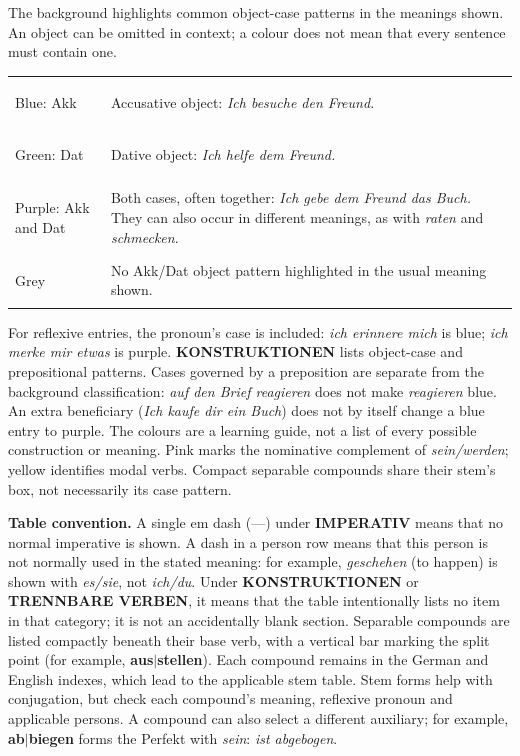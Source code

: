 \begin{tcolorbox}[colback=white,colframe=genderMasculine,title={Table colours},fonttitle=\bfseries]
The background highlights common object-case patterns in the meanings shown.
An object can be omitted in context; a colour does not mean that every sentence
must contain one.

\smallskip
\begin{tabularx}{\linewidth}{@{}lX@{}}
\colorbox{caseAccusativeBg}{\strut Blue: Akk} &
Accusative object: \textit{Ich besuche den Freund.}\\
\colorbox{caseDativeBg}{\strut Green: Dat} &
Dative object: \textit{Ich helfe dem Freund.}\\
\colorbox{caseAccusativeDativeBg}{\strut Purple: Akk and Dat} &
Both cases, often together: \textit{Ich gebe dem Freund das Buch.}
They can also occur in different meanings, as with \textit{raten} and \textit{schmecken}.\\
\colorbox{black!5!white}{\strut Grey} &
No Akk/Dat object pattern highlighted in the usual meaning shown.\\
\end{tabularx}

\smallskip
For reflexive entries, the pronoun's case is included:
\textit{ich erinnere mich} is blue;
\textit{ich merke mir etwas} is purple.
\textbf{KONSTRUKTIONEN} lists object-case and prepositional patterns.
Cases governed by a preposition are separate from the background classification:
\textit{auf den Brief reagieren} does not make \textit{reagieren} blue.
An extra beneficiary (\textit{Ich kaufe dir ein Buch}) does not by itself
change a blue entry to purple. The colours are a learning guide, not a list of
every possible construction or meaning. Pink marks the nominative complement
of \textit{sein/werden}; yellow identifies modal verbs.
Compact separable compounds share their stem's box, not necessarily its case pattern.
\end{tcolorbox}

\begin{tcolorbox}[colback=referenceYellowBg,colframe=genderPlural]
\textbf{Table convention.} A single em dash (---) under \textbf{IMPERATIV}
means that no normal imperative is shown. A dash in a person row means that
this person is not normally used in the stated meaning: for example,
\textit{geschehen} (to happen) is shown with \textit{es/sie}, not \textit{ich/du}.
Under \textbf{KONSTRUKTIONEN} or
\textbf{TRENNBARE VERBEN}, it means that the table intentionally lists no item
in that category; it is not an accidentally blank section. Separable compounds
are listed compactly beneath their base verb, with a vertical bar marking the
split point (for example, \textbf{aus$|$stellen}). Each compound remains in the
German and English indexes, which lead to the applicable stem table.
Stem forms help with conjugation, but check each compound's meaning, reflexive
pronoun and applicable persons. A compound can also select a different
auxiliary; for example,
\textbf{ab$|$biegen} forms the Perfekt with \textit{sein}:
\textit{ist abgebogen}.
\end{tcolorbox}
